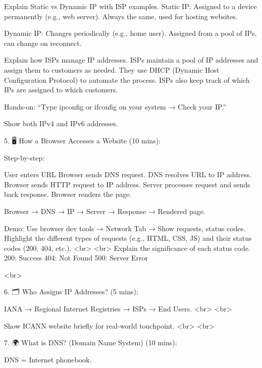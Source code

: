         Explain Static vs Dynamic IP with ISP examples.
            Static IP: Assigned to a device permanently (e.g., web server).
                Always the same, used for hosting websites.

            Dynamic IP: Changes periodically (e.g., home user).
                Assigned from a pool of IPs, can change on reconnect.

            Explain how ISPs manage IP addresses.
                ISPs maintain a pool of IP addresses and assign them to customers as needed.
                They use DHCP (Dynamic Host Configuration Protocol) to automate the process.
                ISPs also keep track of which IPs are assigned to which customers.

        Hands-on: “Type ipconfig or ifconfig on your system → Check your IP.”

            Show both IPv4 and IPv6 addresses.

    5. 🖥️ How a Browser Accesses a Website (10 mins):

        Step-by-step:

        User enters URL
            Browser sends DNS request.
            DNS resolves URL to IP address.
            Browser sends HTTP request to IP address.
            Server processes request and sends back response.
            Browser renders the page.

        Browser → DNS → IP → Server → Response → Rendered page.
            

        Demo: Use browser dev tools → Network Tab → Show requests, status codes.
            Highlight the different types of requests (e.g., HTML, CSS, JS) and their status codes (200, 404, etc.).
                <br>
                <br>
            Explain the significance of each status code.
                200: Success
                404: Not Found
                500: Server Error

                <br>
                


    6. 🗂️ Who Assigns IP Addresses? (5 mins):

        IANA → Regional Internet Registries → ISPs → End Users.
            <br>
            <br>
            
        Show ICANN website briefly for real-world touchpoint.
            <br>
            <br>

    7. 🌍 What is DNS? (Domain Name System) (10 mins):
    
        DNS = Internet phonebook.



